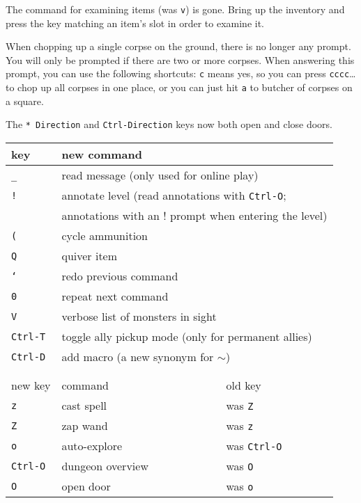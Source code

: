 \documentclass[a4paper,10pt]{article}
\newcommand{\key}[1]{{\texttt{#1}}} %
\newcommand{\para}{\vspace{1.5ex}}
\newcommand{\mc}[1]{\multicolumn{2}{l}{#1}}
\begin{document}
\para

The command for examining items (was \key{v}) is gone. Bring up the
inventory and press the key matching an item's slot in order to examine it.

When chopping up a single corpse on the ground, there is no longer any
prompt. You will only be prompted if there are two or more corpses. When
answering this prompt, you can use the following shortcuts: \key{c} means 
yes, so you can press \key{cccc}\dots to chop up all corpses in one place,
or you can just hit \key{a} to butcher of corpses on a square.

The \key{* Direction} and \key{Ctrl-Direction} keys now both open and close
doors.

\para\para

\begin{center}
\begin{tabular}{lll}
key          & new command \\ \hline
\key{\_}     & \mc{read message (only used for online play)} \\
\key{!}      & \mc{annotate level (read annotations with \key{Ctrl-O};} \\
             & \mc{annotations with an ! prompt when entering the level)} \\
\key{(}      & \mc{cycle ammunition} \\
\key{Q}      & \mc{quiver item}      \\
\key{`}      & \mc{redo previous command} \\
\key{0}      & \mc{repeat next command} \\
\key{V}      & \mc{verbose list of monsters in sight} \\
\key{Ctrl-T} & \mc{toggle ally pickup mode (only for permanent allies)} \\
\key{Ctrl-D} & \mc{add macro (a new synonym for \key{$\sim$})} \\
\\
\\
new key      & command          & old key \\ \hline
\key{z}      & cast spell       & was \key{Z}      \\
\key{Z}      & zap wand         & was \key{z}      \\
\key{o}      & auto-explore     & was \key{Ctrl-O} \\
\key{Ctrl-O} & dungeon overview\phantom{xxx} & was \key{O}      \\
\key{O}      & open door        & was \key{o}      \\

\end{tabular}
\end{center}
\end{document}
